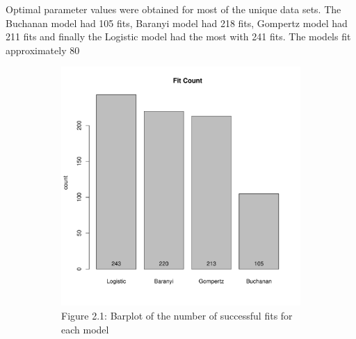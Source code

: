 \documentclass[11pt]{article}
\begin{document}
Optimal parameter values were obtained for most of the unique data sets. The Buchanan model had 105 fits, Baranyi model had 218 fits, Gompertz model had 211 fits and finally the Logistic model had the most with 241 fits. The models fit approximately 80%
\begin{figure}[h!]
    \centering
    \begin{subfigure}[h]{0.4\textwidth}
        \includegraphics[width=\textwidth]{../Results/Fit_count.pdf}
        \caption{Figure 2.1: Barplot of the number of successful fits for each model}
        \label{fig:Fit Count}
    \end{subfigure}
    \hfill
    \begin{subfigure}[h]{0.4\textwidth}

\end{subfigure}
\end{figure}
\end{document}
